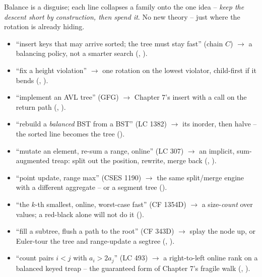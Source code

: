 
Balance is a disguise; each line collapses a family onto the one idea -- \emph{keep the descent short by
construction, then spend it}. No new theory -- just where the rotation is already hiding.

\begin{itemize}[nosep, leftmargin=1.4em]
  \item ``insert keys that may arrive sorted; the tree must stay fast'' (chain $C$) $\longrightarrow$
        a balancing policy, not a smarter search (, ).
  \item ``fix a height violation'' $\longrightarrow$ one rotation on the lowest violator, child-first if it
        bends (, ).
  \item ``implement an AVL tree'' (GFG) $\longrightarrow$ Chapter 7's insert with a  call on
        the return path (, ).
  \item ``rebuild a \emph{balanced} BST from a BST'' (LC 1382) $\longrightarrow$ its inorder, then halve --
        the sorted line becomes the tree ().
  \item ``mutate an element, re-sum a range, online'' (LC 307) $\longrightarrow$ an implicit, sum-augmented
        treap: split out the position, rewrite, merge back (, ).
  \item ``point update, range max'' (CSES 1190) $\longrightarrow$ the same split/merge engine with a
        different aggregate -- or a segment tree ().
  \item ``the $k$-th smallest, online, worst-case fast'' (CF 1354D) $\longrightarrow$ a size-\emph{count}
        over values; a red-black  alone will not do it ().
  \item ``fill a subtree, flush a path to the root'' (CF 343D) $\longrightarrow$ splay the node up, or
        Euler-tour the tree and range-update a segtree (, ).
  \item ``count pairs $i<j$ with $a_i>2a_j$'' (LC 493) $\longrightarrow$ a right-to-left online rank on a
        balanced keyed treap -- the guaranteed form of Chapter 7's fragile walk (,
        ).
\end{itemize}


